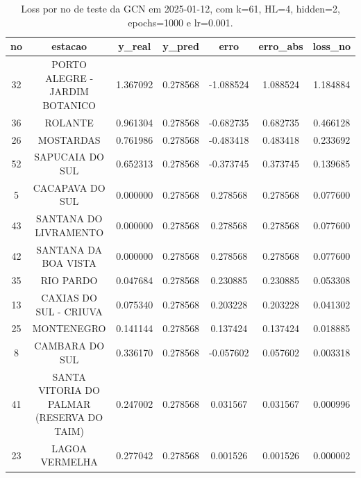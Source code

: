 \begin{table}[h]
\centering
\caption{Loss por no de teste da GCN em 2025-01-12, com k=61, HL=4, hidden=2, epochs=1000 e lr=0.001.}
\label{tab:gcn_loss_k61_hl4_h2_e1000_d20250112}
\begin{tabular}{ccccccc}
\toprule
no & estacao & y\_real & y\_pred & erro & erro\_abs & loss\_no \\
\midrule
32 & PORTO ALEGRE - JARDIM BOTANICO & 1.367092 & 0.278568 & -1.088524 & 1.088524 & 1.184884 \\
36 & ROLANTE & 0.961304 & 0.278568 & -0.682735 & 0.682735 & 0.466128 \\
26 & MOSTARDAS & 0.761986 & 0.278568 & -0.483418 & 0.483418 & 0.233692 \\
52 & SAPUCAIA DO SUL & 0.652313 & 0.278568 & -0.373745 & 0.373745 & 0.139685 \\
5 & CACAPAVA DO SUL & 0.000000 & 0.278568 & 0.278568 & 0.278568 & 0.077600 \\
43 & SANTANA DO LIVRAMENTO & 0.000000 & 0.278568 & 0.278568 & 0.278568 & 0.077600 \\
42 & SANTANA DA BOA VISTA & 0.000000 & 0.278568 & 0.278568 & 0.278568 & 0.077600 \\
35 & RIO PARDO & 0.047684 & 0.278568 & 0.230885 & 0.230885 & 0.053308 \\
13 & CAXIAS DO SUL - CRIUVA & 0.075340 & 0.278568 & 0.203228 & 0.203228 & 0.041302 \\
25 & MONTENEGRO & 0.141144 & 0.278568 & 0.137424 & 0.137424 & 0.018885 \\
8 & CAMBARA DO SUL & 0.336170 & 0.278568 & -0.057602 & 0.057602 & 0.003318 \\
41 & SANTA VITORIA DO PALMAR (RESERVA DO TAIM) & 0.247002 & 0.278568 & 0.031567 & 0.031567 & 0.000996 \\
23 & LAGOA VERMELHA & 0.277042 & 0.278568 & 0.001526 & 0.001526 & 0.000002 \\
\bottomrule
\end{tabular}
\end{table}
